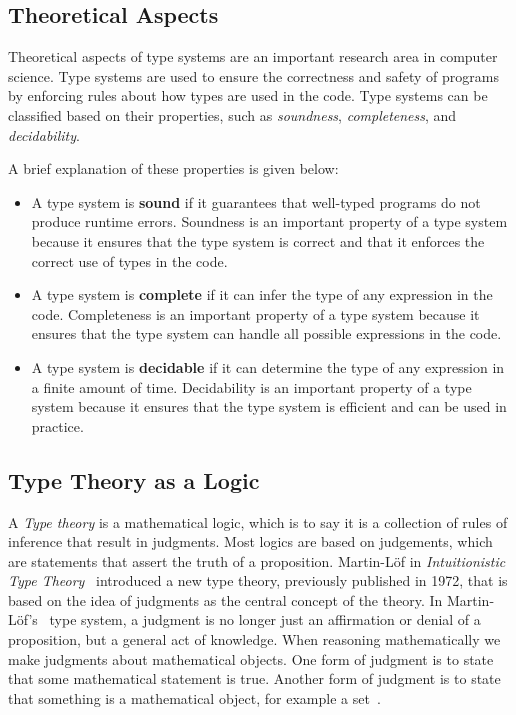\subsection{Theoretical Aspects}\label{subsec:background:TheoreticalAspects}

Theoretical aspects of type systems are an important research area in computer science. Type systems are used to ensure the correctness and safety of programs by enforcing rules about how types are used in the code. Type systems can be classified based on their properties, such as \textit{soundness}, \textit{completeness}, and \textit{decidability}.

A brief explanation of these properties is given below:
\begin{itemize}
    \item A type system is \textbf{sound} if it guarantees that well-typed programs do not produce runtime errors. Soundness is an important property of a type system because it ensures that the type system is correct and that it enforces the correct use of types in the code.
    \item A type system is \textbf{complete} if it can infer the type of any expression in the code. Completeness is an important property of a type system because it ensures that the type system can handle all possible expressions in the code.
    \item A type system is \textbf{decidable} if it can determine the type of any expression in a finite amount of time. Decidability is an important property of a type system because it ensures that the type system is efficient and can be used in practice.
\end{itemize}

\subsection{Type Theory as a Logic}\label{subsec:background:TypeTheoryAsALogic}

A \textit{Type theory} is a mathematical logic, which is to say it is a collection of rules of inference that result in judgments.
Most logics are based on judgements, which are statements that assert the truth of a proposition.
Martin-L\"of in \textit{Intuitionistic Type Theory}~\cite{Martin84} introduced a new type theory, previously published in 1972, that is based on the idea of judgments as the central concept of the theory.
In Martin-L\"of's~\cite{Martin96} type system, a judgment is no longer just an affirmation or denial of a proposition, but a general act of knowledge. When reasoning mathematically we make judgments about mathematical objects. One form of judgment is to state that some mathematical statement is true. Another form of judgment is to state that something is a mathematical object, for example a set~\cite{sep-type-theory-intuitionistic}.

